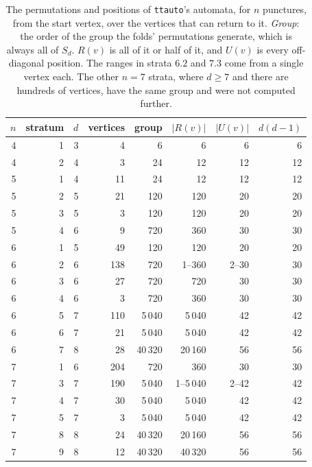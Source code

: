\documentclass[11pt]{amsart}
\newcommand{\ttauto}{\texttt{ttauto}}
\theoremstyle{plain}
\theoremstyle{definition}
\begin{document}
\begin{table}[ht]
  \centering
  \small
  \begin{tabular}{rrrrrrrr}
    \toprule
    $n$ & stratum & $d$ & vertices & group & $|R(v)|$ & $|U(v)|$ &
      $d(d-1)$ \\
    \midrule
    4 & 1 & 3 & 4 & 6 & 6 & 6 & 6 \\
    4 & 2 & 4 & 3 & 24 & 12 & 12 & 12 \\
    5 & 1 & 4 & 11 & 24 & 12 & 12 & 12 \\
    5 & 2 & 5 & 21 & 120 & 120 & 20 & 20 \\
    5 & 3 & 5 & 3 & 120 & 120 & 20 & 20 \\
    5 & 4 & 6 & 9 & 720 & 360 & 30 & 30 \\
    6 & 1 & 5 & 49 & 120 & 120 & 20 & 20 \\
    6 & 2 & 6 & 138 & 720 & 1--360 & 2--30 & 30 \\
    6 & 3 & 6 & 27 & 720 & 720 & 30 & 30 \\
    6 & 4 & 6 & 3 & 720 & 360 & 30 & 30 \\
    6 & 5 & 7 & 110 & 5\,040 & 5\,040 & 42 & 42 \\
    6 & 6 & 7 & 21 & 5\,040 & 5\,040 & 42 & 42 \\
    6 & 7 & 8 & 28 & 40\,320 & 20\,160 & 56 & 56 \\
    7 & 1 & 6 & 204 & 720 & 360 & 30 & 30 \\
    7 & 3 & 7 & 190 & 5\,040 & 1--5\,040 & 2--42 & 42 \\
    7 & 4 & 7 & 30 & 5\,040 & 5\,040 & 42 & 42 \\
    7 & 5 & 7 & 3 & 5\,040 & 5\,040 & 42 & 42 \\
    7 & 8 & 8 & 24 & 40\,320 & 20\,160 & 56 & 56 \\
    7 & 9 & 8 & 12 & 40\,320 & 40\,320 & 56 & 56 \\
    \bottomrule
  \end{tabular}
  \caption{The permutations and positions of \ttauto's automata, for $n$
    punctures, from the start vertex, over the vertices that can return to
    it.  \emph{Group}: the order of the group the folds' permutations
    generate, which is always all of $S_d$.  $R(v)$ is all of it or half
    of it, and $U(v)$ is every off-diagonal position.  The ranges in strata
    $6.2$ and $7.3$ come from a single vertex each.  The other $n=7$
    strata, where $d\ge7$ and there are hundreds of vertices, have the same
    group and were not computed further.}
  \label{tab:census}
\end{table}
\end{document}
